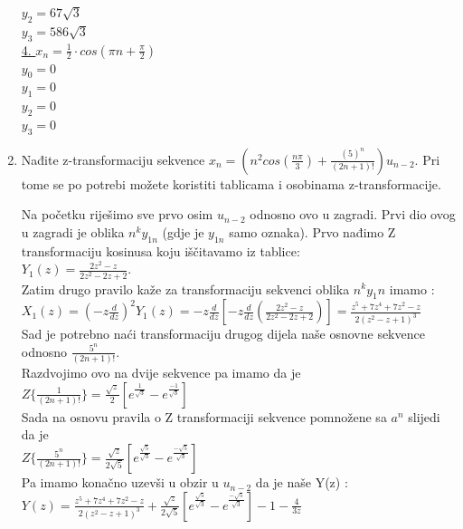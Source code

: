 \documentclass[12pt]{article}
\begin{document}
\begin{enumerate}
\begin{center}
	    $y_2 = 67\sqrt{3}$\\
	    $y_3 = 586\sqrt{3}$\\
	      \vspace{0.25cm}
	     \underline{4. $x_n = \frac{1}{2} \cdot cos (\pi n + \frac{\pi}{2})$}\\
	     \vspace{0.25cm}
	        $y_0 = 0$\\
	    $y_1 = 0$\\
	    $y_2 = 0$\\
	    $y_3 = 0$\\
	      \vspace{0.25cm}
	\end{center}
	\item Nađite z-transformaciju sekvence $x_n = (n^2 cos (\frac{n\pi}{3}) + \frac{(5)^n}{(2n + 1)!} ) u_{n-2}$. Pri tome se po potrebi možete koristiti tablicama i osobinama z-transformacije.\\
	\begin{center}
    Na početku riješimo sve prvo osim $u_{n-2}$ odnosno ovo u zagradi. Prvi dio ovog u zagradi je oblika $n^ky_{1n}$ (gdje je $y_{1n}$ samo oznaka). Prvo nađimo Z transformaciju kosinusa koju iščitavamo iz tablice:\\
    $Y_1(z) = \frac{2z^2 - z}{2z^2 - 2z + 2}$.\\
    Zatim drugo pravilo kaže za transformaciju sekvenci oblika $n^ky_1n$ imamo :\\
    $X_1(z) = (-z\frac{d}{dz})^2Y_1(z) = -z\frac{d}{dz}[-z\frac{d}{dz}(\frac{2z^2 - z}{2z^2 - 2z + 2})] = \frac{z^5 + 7z^4 + 7z^2 - z}{2(z^2-z+1)^3}$ \\
    \vspace{0.3cm} 
    Sad je potrebno naći transformaciju drugog dijela naše osnovne sekvence odnosno $\frac{5^n}{(2n+1)!}$.\\
    Razdvojimo ovo na dvije sekvence pa imamo da je $Z\{ \frac{1}{(2n+1)!} \} = \frac{\sqrt{z}}{2}[e^{\frac{1}{\sqrt{3}}} - e^{\frac{-1}{\sqrt{3}}}]$ \\
    \vspace{0.3cm} 
    Sada na osnovu pravila o Z transformaciji sekvence pomnožene sa $a^n$ slijedi da je \\
     $Z\{ \frac{5^n}{(2n+1)!} \} = \frac{\sqrt{z}}{2\sqrt{5}}[e^{\frac{\sqrt{5}}{\sqrt{3}}} - e^{\frac{-\sqrt{5}}{\sqrt{3}}}]$ \\
     \vspace{0.3cm}
     Pa imamo konačno uzevši u obzir u $u_{n-2}$ da je naše Y(z) :
     $Y(z) = \frac{z^5 + 7z^4 + 7z^2 - z}{2(z^2-z+1)^3} + \frac{\sqrt{z}}{2\sqrt{5}}[e^{\frac{\sqrt{5}}{\sqrt{3}}} - e^{\frac{-\sqrt{5}}{\sqrt{3}}}] - 1 - \frac{4}{3z}$
   

\end{center}
\end{enumerate}
\end{document}
